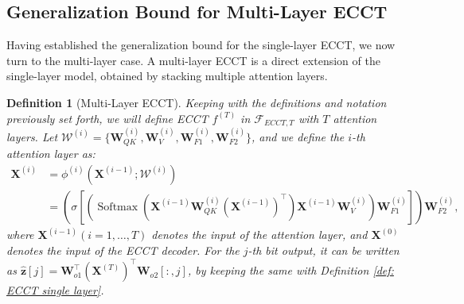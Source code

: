 \documentclass[lettersize,onecolumn]{IEEEtran}
\newtheorem{definition}{Definition}
\newtheorem{remark}{Remark}
\begin{document}

\subsection{Generalization Bound for Multi-Layer ECCT}

Having established the generalization bound for the single-layer ECCT, we now turn to the multi-layer case. A multi-layer ECCT is a direct extension of the single-layer model, obtained by stacking multiple attention layers.

\begin{definition}[Multi-Layer ECCT]\label{def: multi-layer ECCT}
    Keeping with the definitions and notation previously set forth, we will define ECCT $f^{(T)}$ in $\mathcal{F}_{ECCT,T}$ with $T$ attention layers. Let $\mathcal{W}^{(i)}=\{\mathbf{W}_{QK}^{(i)},\mathbf{W}_{V}^{(i)},\mathbf{W}_{F1}^{(i)},\mathbf{W}_{F2}^{(i)}\}$, and we define the $i$-th attention layer as:
    \begin{equation}
        \begin{aligned}
        \mathbf{X}^{(i)}&=\phi^{(i)}\left(\mathbf{X}^{(i-1)};\mathcal{W}^{(i)}\right)\\  &=\left(\sigma\left[\left(\operatorname{Softmax}\left(\mathbf{X}^{(i-1)} \mathbf{W}_{QK}^{(i)} (\mathbf{X}^{(i-1)})^{\top}\right) \mathbf{X}^{(i-1)} \mathbf{W}_{V}^{(i)}\right) \mathbf{W}_{F1}^{(i)}\right]\right) \mathbf{W}_{F2}^{(i)},
        \end{aligned}
    \end{equation}
    where $\mathbf{X}^{(i-1)}(i=1,\ldots,T)$ denotes the input of the attention layer, and $\mathbf{X}^{(0)}$ denotes the input of the ECCT decoder. For the $j$-th bit output, it can be written as $\hat{\mathbf{z}}[j]=\mathbf{W}_{o 1}^{\top} (\mathbf{X}^{(T)})^{\top} \mathbf{W}_{o 2}[:, j]$, by keeping the same with Definition \ref{def: ECCT single layer}.
\end{definition}
\end{document}
